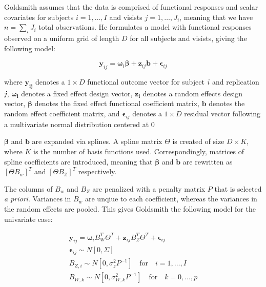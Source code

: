 \documentclass[AMA,Times1COL]{WileyNJDv5} %
\begin{document}
Goldsmith assumes that the data is comprised of functional responses and scalar covariates for subjects \(i=1,\dots, I\) and visists \(j=1,\dots, J_i\), meaning that we have \(n = \sum_{i}J_i\) total observations.  He formulates a model with functional responses observed on a uniform grid of length \(D\) for all subjects and visists, giving the following model:

\begin{equation}
    \boldsymbol{y}_{ij} = \boldsymbol{\omega}_i\boldsymbol{\beta} + \boldsymbol{z}_{ij}\boldsymbol{b} + \boldsymbol{\epsilon}_{ij}
\end{equation}

where \(\boldsymbol{y_{ij}}\) denotes a \(1 \times D\) functional outcome vector for subject \(\emph{i}\) and replication \(\emph{j}\), \(\boldsymbol{\omega_i}\) denotes a fixed effect design vector, \(\boldsymbol{z_i}\) denotes a random effects design vector, \(\boldsymbol{\beta}\) denotes the fixed effect functional coefficient matrix, \(\boldsymbol{b}\) denotes the random effect coefficient matrix, and  \(\boldsymbol{\epsilon}_{ij}\) denotes a \(1 \times D \) residual vector following a multivariate normal distribution centered at 0\cite{goldsmith_assessing_2016}

\(\boldsymbol{\beta}\) and \(\boldsymbol{b}\) are expanded via splines.  A spline matrix \(\Theta\) is created of size \(D \times K\), where \(K\) is the number of basis functions used.  Correspondingly, matrices of spline coefficients are introduced, meaning that \(\boldsymbol{\beta}\) and \(\boldsymbol{b}\) are rewritten as \(\left[\Theta B_w\right]^T\) and \(\left[\Theta B_Z\right]^T\) respectively.

The columns of \(B_w\) and \(B_Z\) are penalized with a penalty matrix \(P\) that is selected \emph{a priori}.  Variances in \(B_w\) are unqiue to each coefficient, whereas the variances in the random effects are pooled.  This gives Goldsmith the following model for the univariate case:

\begin{equation}
    \begin{split}
        \boldsymbol{y}_{ij} = \boldsymbol{\omega}_iB_W^T\Theta^T + \boldsymbol{z}_{ij}B_Z^T\Theta^T + \boldsymbol{\epsilon}_{ij}\\
        \boldsymbol{\epsilon}_{ij} \sim N[0, \Sigma]\\
        B_{Z,i} \sim N[0, \sigma_z^2P^{-1}]\quad \text{for} \quad i = 1,\dots, I\\
        B_{W, k} \sim N[0, \sigma_{W,k}^2P^{-1}]\quad \text{for} \quad k = 0,\dots, p\\
    \end{split}
\end{equation}
\end{document}
